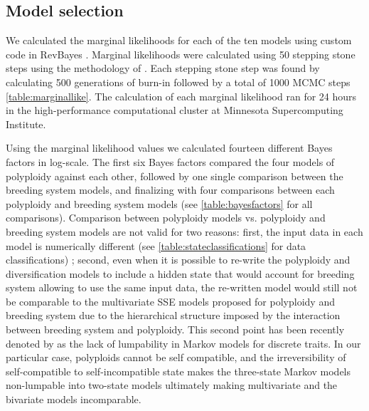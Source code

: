 \subsection{Model selection}
We calculated the marginal likelihoods  for each of the ten models using custom code in RevBayes \citet{hoehna_2016}.  Marginal likelihoods were calculated using 50  stepping stone steps using the methodology of \citet{xie_2010}. Each stepping stone step was found by calculating 500 generations of burn-in followed by a total of 1000 MCMC steps \cref{table:marginallike}.  The calculation of each marginal likelihood ran for 24 hours in the high-performance computational cluster at Minnesota Supercomputing Institute.\newline

Using the marginal likelihood values we calculated fourteen different Bayes factors in log-scale. The first six Bayes factors compared the four models of polyploidy against each other, followed by one single comparison between the breeding system models, and finalizing with four comparisons between each polyploidy and breeding system models (see \cref{table:bayesfactors} for all comparisons). Comparison between polyploidy models vs. polyploidy and breeding system models are not valid for two reasons: first, the input data in each model is numerically different (see \cref{table:stateclassifications} for data classifications)
; second, even when it is possible to re-write the polyploidy and diversification models to include a hidden state that would account for breeding system allowing to use the same input data, the re-written model would still not be comparable to the multivariate SSE models proposed for polyploidy and breeding system due to the hierarchical structure imposed by the interaction between breeding system and polyploidy. This second point has been recently denoted by \citet{tarasov_2019} as the lack of lumpability in Markov models for discrete traits.  In our particular case, polyploids cannot be self compatible, and the irreversibility of self-compatible to self-incompatible state makes the three-state Markov models non-lumpable into two-state models ultimately making  multivariate and the bivariate models incomparable.


